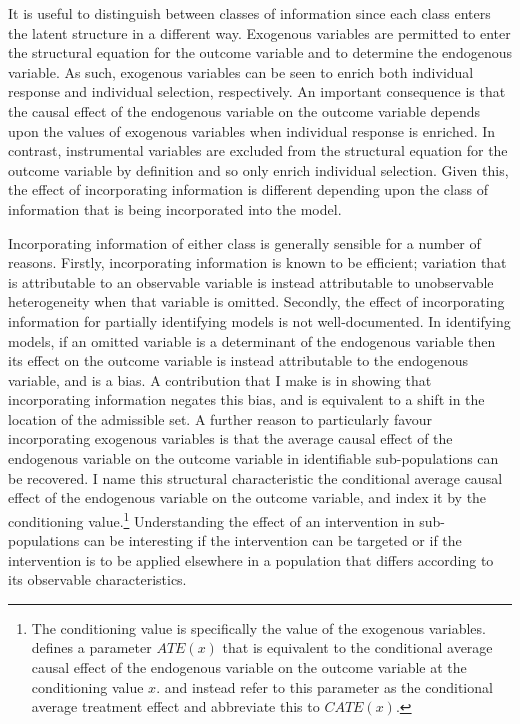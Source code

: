 \documentclass[12pt,a4paper,twoside]{article}
\numberwithin{equation}{section}
\begin{document}
It is useful to distinguish between classes of information since each class enters the latent structure in a different way. Exogenous variables are permitted to enter the structural equation for the outcome variable and to determine the endogenous variable. As such, exogenous variables can be seen to enrich both individual response and individual selection, respectively. An important consequence is that the causal effect of the endogenous variable on the outcome variable depends upon the values of exogenous variables when individual response is enriched. In contrast, instrumental variables are excluded from the structural equation for the outcome variable by definition and so only enrich individual selection. Given this, the effect of incorporating information is different depending upon the class of information that is being incorporated into the model.  

Incorporating information of either class is generally sensible for a number of reasons. Firstly, incorporating information is known to be efficient; variation that is attributable to an observable variable is instead attributable to unobservable heterogeneity when that variable is omitted. Secondly, the effect of incorporating information for partially identifying models is not well-documented. In identifying models, if an omitted variable is a determinant of the endogenous variable then its effect on the outcome variable is instead attributable to the endogenous variable, and is a bias. A contribution that I make is in showing that incorporating information negates this bias, and is equivalent to a shift in the location of the admissible set. A further reason to particularly favour incorporating exogenous variables is that the average causal effect of the endogenous variable on the outcome variable in identifiable sub-populations can be recovered. I name this structural characteristic the conditional average causal effect of the endogenous variable on the outcome variable, and index it by the conditioning value.\footnote{The conditioning value is specifically the value of the exogenous variables. \cite{hEvY05} defines a parameter $ATE(x)$ that is equivalent to the conditional average causal effect of the endogenous variable on the outcome variable at the conditioning value $x$. \cite{kHt10} and \cite{13.misc.abrevaya} instead refer to this parameter as the conditional average treatment effect and abbreviate this to $CATE(x)$.} Understanding the effect of an intervention in sub-populations can be interesting if the intervention can be targeted or if the intervention is to be applied elsewhere in a population that differs according to its observable characteristics. 
\end{document}
